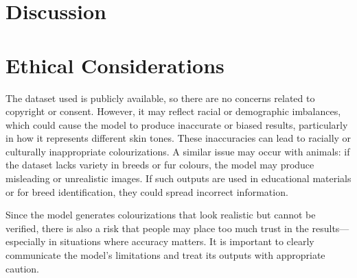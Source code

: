 \documentclass{article} %
\begin{document}
\section{Discussion}
\label{discussion}

\section{Ethical Considerations}
\label{ethical}

The dataset used is publicly available, so there are no concerns related to copyright or consent. However, it may reflect racial or demographic imbalances, which could cause the model 
to produce inaccurate or biased results, particularly in how it represents different skin tones. These inaccuracies can lead to racially or culturally inappropriate colourizations. A 
similar issue may occur with animals: if the dataset lacks variety in breeds or fur colours, the model may produce misleading or unrealistic images. If such outputs are used in educational 
materials or for breed identification, they could spread incorrect information.

Since the model generates colourizations that look realistic but cannot be verified, there is also a risk that people may place too much trust in the results—especially in situations 
where accuracy matters. It is important to clearly communicate the model's limitations and treat its outputs with appropriate caution.

\label{last_page}

\newpage


\end{document}
